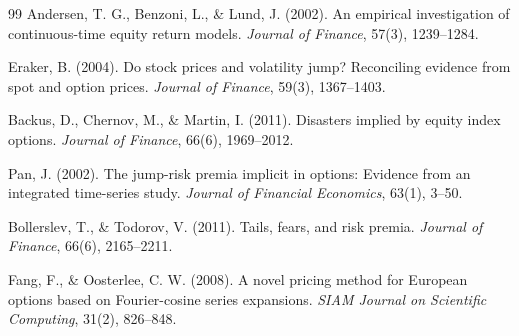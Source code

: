 \documentclass[12pt]{article}
\begin{document}
\begin{thebibliography}{99}
Andersen, T. G., Benzoni, L., \& Lund, J. (2002).
An empirical investigation of continuous-time equity return models.
\textit{Journal of Finance}, 57(3), 1239--1284.

Eraker, B. (2004).
Do stock prices and volatility jump? Reconciling evidence from spot and option prices.
\textit{Journal of Finance}, 59(3), 1367--1403.

Backus, D., Chernov, M., \& Martin, I. (2011).
Disasters implied by equity index options.
\textit{Journal of Finance}, 66(6), 1969--2012.

Pan, J. (2002).
The jump-risk premia implicit in options: Evidence from an integrated time-series study.
\textit{Journal of Financial Economics}, 63(1), 3--50.

Bollerslev, T., \& Todorov, V. (2011).
Tails, fears, and risk premia.
\textit{Journal of Finance}, 66(6), 2165--2211.

Fang, F., \& Oosterlee, C. W. (2008).
A novel pricing method for European options based on Fourier-cosine series expansions.
\textit{SIAM Journal on Scientific Computing}, 31(2), 826--848.

\end{thebibliography}
\end{document}

